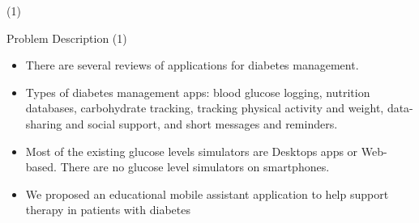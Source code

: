 



\begin{frame}{ \footnotemark (1)}
\begin{block}{Problem Description \footnotemark (1)} 
	\begin{itemize}
	\item There are several reviews of applications for diabetes management.

	\item Types of diabetes management apps: blood glucose logging, nutrition databases, carbohydrate
tracking, tracking physical activity and weight, data-sharing and social support, and short messages and reminders.
\item Most of the existing glucose levels simulators are Desktops apps or Web-based. There are no glucose level simulators on smartphones. 

\item We proposed an educational mobile assistant application to help support therapy in patients with diabetes
	\end{itemize}
\end{block} 
\setcounter{footnote}{0}

\end{frame}

